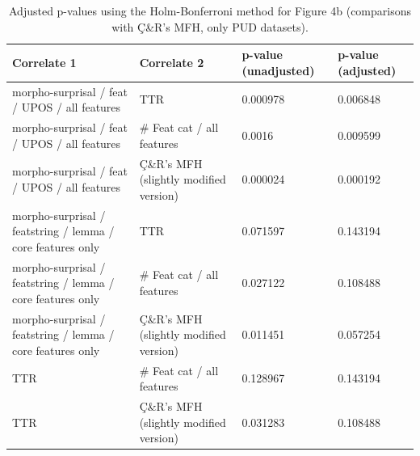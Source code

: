 \documentclass[USenglish]{article}
\begin{document}
\begin{table}[ht]
    \centering
    \caption{Adjusted p-values using the Holm-Bonferroni method \citep{holm_simple_1979} for Figure 4b
    (comparisons with Ç\&R’s MFH, only PUD datasets). } %
    \label{tab:p_values_adjusted_cr_PUD}   
   \begin{tabular}{p{3.1cm}p{3.1cm}p{2.4cm}p{2.4cm}}
\toprule
	\textbf{Correlate 1}	&	\textbf{Correlate 2}& \textbf{p-value \newline(unadjusted)}    &	\textbf{p-value \newline(adjusted)}	\\
    \midrule
morpho-surprisal /   feat /   UPOS /   all features	&	TTR	&	0.000978	&0.006848
	\\ \midrule
morpho-surprisal /   feat /   UPOS /   all features&	\# Feat cat /   all features	&	0.0016 &	0.009599
	\\ \midrule
morpho-surprisal /   feat /   UPOS /   all features	&	Ç\&R's MFH (slightly modified version)	&	0.000024	 & 0.000192
	\\ \midrule
morpho-surprisal /   featstring  /    lemma /   core features only	&	TTR	&	0.071597	& 0.143194 \\ \midrule
morpho-surprisal /   featstring  /    lemma /   core features only&	\# Feat cat /   all features	&	0.027122	&0.108488	\\ \midrule
morpho-surprisal /   featstring  /    lemma /   core features only	&	Ç\&R's MFH (slightly modified version)	&	0.011451	& 0.057254	\\ \midrule
TTR&	\# Feat cat /   all features	&0.128967 &	0.143194
\\ \midrule
TTR	&	Ç\&R's MFH (slightly modified version)	&	0.031283	& 0.108488
	\\ \bottomrule
\end{tabular}
\end{table}
\end{document}
